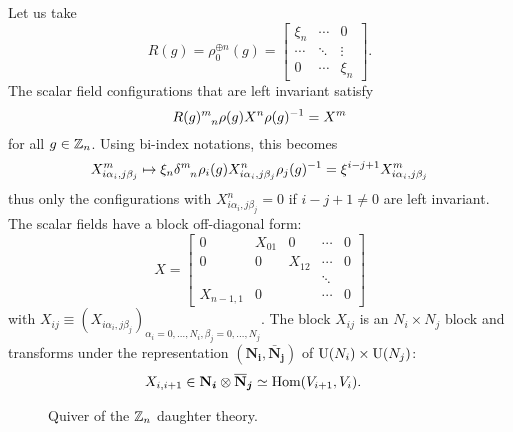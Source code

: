 \documentclass[a4paper,11pt]{article}
\begin{document}
        Let us take
        \begin{equation}
            R(g)= \rho^{\oplus n}_0(g) = 
            \begin{bmatrix}
                \xi_n & \cdots & 0 \\
                \cdots & \ddots & \vdots \\
                0 & \cdots & \xi_n
            \end{bmatrix}.
        \end{equation}
        The scalar field configurations that are left invariant satisfy
        \begin{equation}
            R(g)\indices{^m_n}\rho(g)X^n\rho(g)^{-1}=X^m
        \end{equation}
        for all $g\in\mathbb{Z}_n$. Using bi-index notations, this becomes
        \begin{equation}
            X^m_{i\alpha_i,j\beta_j}\mapsto  \xi_n\delta\indices{^m_n}\rho_i(g) X^n_{i\alpha_i,j\beta_j}\rho_j(g)^{-1} = \xi^{i-j+1}X^m_{i\alpha_i,j\beta_j}
        \end{equation}
        thus only the configurations with $X^n_{i\alpha_i,j\beta_j}=0$ if $i-j+1\neq0$ are left invariant. The scalar fields have a block off-diagonal form:
        \begin{equation}
            X=
            \begin{bmatrix}
                0 & X_{01} & 0 & \cdots & 0 \\
                0 & 0 & X_{12} & \cdots & 0 \\
                & & & \ddots & \\
                X_{n-1,1} & 0 & & \cdots & 0
            \end{bmatrix}
        \end{equation}
        with $X_{ij}\equiv (X_{i\alpha_i,j\beta_j})_{\alpha_i=0,\dots,N_i,\beta_j=0,\dots,N_j}$. The block $X_{ij}$ is an $N_i\times N_j$ block and transforms under the representation $(\boldsymbol{\textbf{N}_i},\boldsymbol{\bar{\textbf{N}}_j})$ of $\text{U}(N_i)\times\text{U}(N_j)$:
        \begin{align*}
            X_{i,i+1} &\in \boldsymbol{\textbf{N}_i}\otimes\boldsymbol{\overline{\textbf{N}}_j} \simeq \text{Hom}(V_{i+1},V_i).
        \end{align*}

        \begin{figure}
            \centering
            \caption{Quiver of the $\mathbb{Z}_n$ daughter theory.}
        \end{figure}
\end{document}
